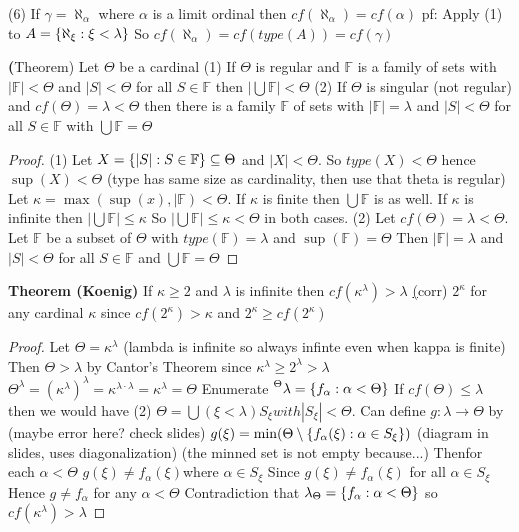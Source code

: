 (6) If $\gamma = \aleph_\alpha$ where $\alpha$ is a limit ordinal then $cf(\aleph_\alpha) = cf(\alpha)$
pf:
    Apply (1) to $A=\{\aleph_\xi : \xi < \lambda\}$
    So $cf(\aleph_\alpha) = cf(type(A)) = cf(\gamma)$


\textbf(Theorem) Let $\Theta$ be a cardinal
(1) If $\Theta$ is regular and $\mathbb{F}$ is a family of sets with $|\mathbb{F}| < \Theta$ and $|S|<\Theta$ for all $S \in \mathbb{F}$
then $|\bigcup \mathbb{F}| < \Theta$
(2) If $\Theta$ is singular (not regular) and $cf(\Theta) = \lambda < \Theta$ then there is a family $\mathbb{F}$ of sets with
$|\mathbb{F}| = \lambda$ and $|S| < \Theta$ for all $S \in \mathbb{F}$ with $\bigcup \mathbb{F} = \Theta$

\begin{proof}
(1) Let $X = \{|S| : S \in \mathbb{F}\} \subseteq \Theta$ and $|X| < \Theta$.
    So $type(X) < \Theta$ hence $\sup(X) < \Theta$ (type has same size as cardinality, then use that theta is regular)
    Let $\kappa=\max(\sup(x), |\mathbb{F}) < \Theta$.
    If $\kappa$ is finite then $\bigcup \mathbb{F}$ is as well.
    If $\kappa$ is infinite then $|\bigcup \mathbb{F}| \leq \kappa$
    So $|\bigcup \mathbb{F}| \leq \kappa < \Theta$ in both cases.
(2) Let $cf(\Theta) = \lambda < \Theta$.
    Let $\mathbb{F}$ be a subset of $\Theta$ with $type(\mathbb{F}) = \lambda$ and $\sup(\mathbb{F}) = \Theta$
    Then $|\mathbb{F}| = \lambda$ and $|S| < \Theta$ for all $S \in \mathbb{F}$
    and $\bigcup \mathbb{F} = \Theta$
\end{proof}

\textbf{Theorem (Koenig)}
If $\kappa \geq 2$ and $\lambda$ is infinite then $cf(\kappa^\lambda) > \lambda$
\underline(corr) $2^\kappa$ for any cardinal $\kappa$
since $cf(2^\kappa)>\kappa$ and $2^\kappa \geq cf(2^\kappa)$

\begin{proof}
    Let $\Theta = \kappa^\lambda$ (lambda is infinite so always infinte even when kappa is finite)
    Then $\Theta > \lambda$ by Cantor's Theorem since $\kappa^\lambda \geq 2^\lambda > \lambda$
    $\Theta^\lambda = (\kappa^\lambda)^\lambda = \kappa^{\lambda \cdot \lambda} = \kappa^\lambda = \Theta$
    Enumerate $\leftsuperscript{\lambda}{\Theta} = \set{f_\alpha : \alpha < \Theta}$
    If $cf(\Theta) \leq \lambda$ then we would have (2)
    $\Theta = \bigcup(\xi < \lambda) S_{\xi} with |S_\xi| < \Theta$.
    Can define $g: \lambda \rightarrow \Theta$ by (maybe error here? check slides)
    $g(\xi) = \min(\Theta \setminus \{f_\alpha(\xi) : \alpha \in S_\xi\})$
    (diagram in slides, uses diagonalization)
    (the minned set is not empty because...)
    Thenfor each $\alpha < \Theta$ $g(\xi) \neq f_\alpha(\xi)$where $\alpha \in S_\xi$
    Since $g(\xi) \neq f_\alpha(\xi)$ for all $\alpha \in S_\xi$
    Hence $g \neq f_\alpha$ for any $\alpha < \Theta$
    Contradiction that $\lambda_\Theta = \{f_\alpha : \alpha < \Theta\}$
    so $cf(\kappa^\lambda) > \lambda$

\end{proof}

